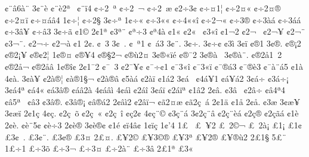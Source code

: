 {^^a2^^a8^^e26^^e0^^a8
3^^a2^^a8^^e8
^^a2^^a8^^e82^^aa^^a0
^^a2^^a8^^ef4
^^a2^^f72^^a0^^aa
^^a2^^f72^^a0^^ac
^^a2^^f72^^a0^^e6
^^a22^^f73^^a2
^^a2^^f7^^a41^^a6
^^a2^^f72^^a4^^ab
^^a2^^f72^^a4^^ad^^ae
^^a2^^f72^^a4^^ad^^ef
^^a2^^f7^^a4^^e1^^e24
1^^a2^^f7^^a6
^^a2^^f72^^a7^^ad
3^^a2^^f7^^aa
1^^a2^^f7^^ab
^^a2^^f73^^ab^^ab
^^a2^^f74^^ab^^ab^^ee
^^a2^^f72^^ac^^ab
^^a2^^f73^^ae
^^a2^^f73^^e0^^e1
^^a2^^f73^^e1^^e1
^^a2^^f73^^e2^^a5
^^a2^^f7^^e23^^ad
3^^a2^^f7^^e3
^^a21^^a9
2^^a21^^aa
^^a23^^aa^^a8
^^a2^^aa^^f73^^ad
^^a2^^aa4^^e0
^^a21^^ab
^^a22^^ab^^a0
^^a23^^ab^^ee
^^a21^^ac2
^^a22^^ac^^a0^^ad
^^a22^^ac^^a5
^^a22^^ac^^a8
^^a23^^ac^^a8.
^^a22^^ac^^f7
^^a22^^ac^^e0
^^a21^^ad
2^^a2^^ad.
^^a2^^ad^^a03
3^^a2^^ad^^a0.
^^a2^^ad^^a0^^aa1
^^a2^^ad^^a0^^e13
3^^a2^^ad^^a8.
3^^a2^^ad^^f7.
3^^a2^^ad^^f7^^a2
^^a23^^ad^^ec
3^^a2^^ad^^ef
^^a2^^ae1
3^^a2^^ae.
^^a2^^ae^^a12
^^a2^^ae2^^a1^^a5
^^a2^^ae^^a22^^a6
1^^a2^^ae^^a4
^^a2^^ae^^a54
^^a2^^ae^^a72^^ac
^^a2^^ae^^f92^^a4
3^^a2^^ae^^ab^^ef^^e9
^^a2^^ae^^af2
3^^a2^^ae^^e0^^a0
3^^a2^^ae^^e0^^a8.
^^a2^^ae2^^e51^^a02
^^a2^^ae2^^e5^^ac
^^a2^^ae2^^e5^^e2
1^^a2^^ae^^ee^^a2
2^^a21^^af2
^^a2^^af^^a03
^^a22^^af^^a5^^a2
^^a2^^af^^f7^^a21
^^a2^^af3^^ab^^ee
^^a2^^af3^^ab^^ef
^^a2^^af^^ae^^e13
^^a2^^af^^ae^^e83
^^a2^^af^^e0^^a8^^e15
^^a21^^e0
4^^a2^^e0.
3^^a2^^e0^^a5
^^a22^^e0^^ae^^a6
^^a2^^e0^^ae1^^a7^^ac
^^a22^^e0^^ae^^e2
^^a25^^e0^^e1
^^a22^^e0^^ef
^^a21^^e12
3^^a2^^e1^^a0
^^a24^^e1^^a51
^^a2^^e1^^a5^^e12
3^^a2^^e1^^f7
^^a23^^e1^^f7^^a1
3^^a2^^e14^^aa
^^a2^^e14^^ab
^^a2^^e13^^e2^^ae
^^a2^^e1^^e22^^e0
4^^a2^^e1^^e2^^ec
4^^a2^^e1^^ec
^^a22^^e1^^ee
3^^a2^^e1^^ef
^^a22^^e1^^ef^^aa
^^a21^^e22
2^^a2^^e2.
^^a23^^e2^^a0
^^a22^^e2^^f7
^^a2^^e24^^aa4
^^a2^^e25^^aa^^a0
^^a2^^e23^^ad
^^a23^^e2^^ae.
^^a23^^e2^^ae^^a1
^^a2^^e2^^ae^^e12
2^^a2^^e2^^ec2
^^a22^^e2^^ef^^ac
^^a2^^e32^^a4^^e6
^^a2^^e32^^e7^^a0^^e1
2^^a21^^e4
^^a21^^e5
2^^a2^^e5.
^^a23^^e6
3^^a2^^e6^^a5
3^^a2^^e6^^ef
2^^a21^^e7
4^^a2^^e7.
^^a22^^e7^^a0^^f5
^^a22^^e7^^a0^^ab
^^a22^^e7^^a0^^ee
^^a2^^e72^^a2
4^^a2^^e7^^a8^^a9
^^a23^^e7^^a8^^e1
3^^a22^^e7^^a8^^e2
^^a22^^e7^^a8^^e8^^e1
^^a22^^e7^^ae
^^a22^^e7^^e3^^e1
^^a21^^e8
2^^a2^^e8.
^^a2^^e8^^a85^^a2
^^a2^^e8^^f73
2^^a2^^e8^^ae
3^^a2^^e8^^ae^^a2
^^a21^^e9
^^a2^^ef4^^e2^^a2
1^^a2^^ef^^e7
1^^a2'4
1^^a3^^a0
^^a3^^a0^^a52
^^a3^^a02^^a9^^ac
^^a3^^a02^^e0^^a1^^ad
^^a31^^a1
^^a31^^a2
^^a33^^a2^^a0.
^^a33^^a2^^a8.
^^a33^^a2^^ae
^^a33^^a4
2^^a3^^a4.
^^a3^^a52^^a9
^^a3^^a53^^a9^^ae
^^a3^^a53^^aa
^^a3^^a52^^ae
^^a3^^a5^^ae^^f92
2^^a31^^a7
5^^a3^^a8
1^^a3^^f71
^^a3^^f73^^f5
^^a3^^f73^^ac
^^a3^^f73^^ad^^a4
^^a3^^f72^^e0^^ad^^a8
^^a3^^f73^^e2
2^^a31^^aa
^^a33^^ab^^a0
}
